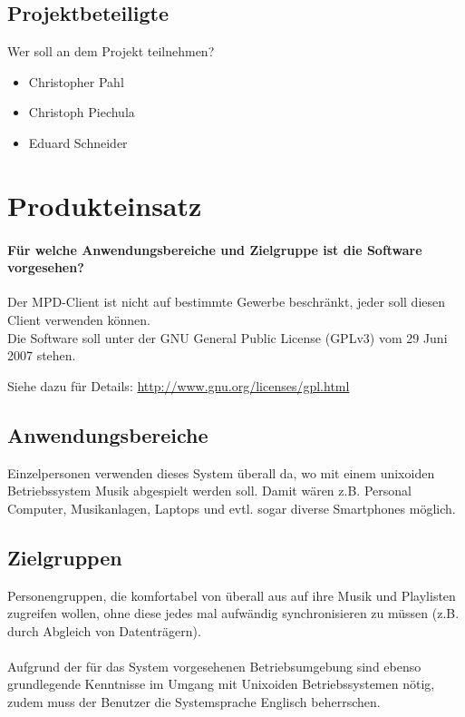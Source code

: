 \subsection{Projektbeteiligte}
Wer soll an dem Projekt teilnehmen?
\begin{itemize}
	\item Christopher Pahl
	\item Christoph Piechula
	\item Eduard Schneider
\end{itemize}
\section{Produkteinsatz}
\paragraph{Für welche Anwendungsbereiche und Zielgruppe ist die Software vorgesehen?} 
Der MPD-Client ist nicht auf bestimmte Gewerbe beschränkt, jeder soll diesen
Client verwenden können. 
\\
Die Software soll unter der GNU General Public License (GPLv3) vom 29 Juni 2007 stehen.
\begin{center}
    Siehe dazu für Details: \url{http://www.gnu.org/licenses/gpl.html}
\end{center}

\subsection{Anwendungsbereiche}
Einzelpersonen verwenden dieses System überall da, wo mit
einem unixoiden Betriebssystem Musik abgespielt werden soll.
Damit wären z.B. Personal Computer, Musikanlagen, Laptops und evtl.
sogar diverse Smartphones möglich.

\subsection{Zielgruppen}
Personengruppen, die komfortabel von überall aus auf ihre Musik und Playlisten zugreifen
wollen, ohne diese jedes mal aufwändig synchronisieren zu müssen (z.B. durch Abgleich von Datenträgern).\ \\ \\
Aufgrund der für das System vorgesehenen Betriebsumgebung sind ebenso grundlegende Kenntnisse im Umgang mit Unixoiden 
Betriebssystemen nötig, zudem muss der Benutzer die Systemsprache Englisch beherrschen.

